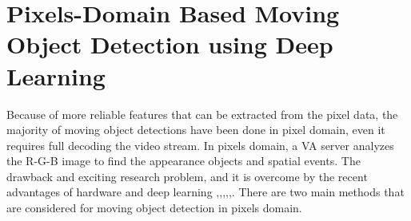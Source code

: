 \section{Pixels-Domain Based Moving Object Detection using Deep Learning}
Because of more reliable features that can be extracted from the pixel data, the majority of moving object detections have been done in pixel domain, even it requires full decoding the video stream. In pixels domain, a VA server analyzes the R-G-B image to find the appearance objects and spatial events. The drawback and exciting research problem, and it is overcome by the recent advantages of hardware and deep learning \cite{zeng2018background},\cite{chen2017pixel},\cite{babaee2018deep},\cite{wang2017interactive},\cite{patil2018msfgnet},\cite{ou2019moving}. There are two main methods that are considered for moving object detection in pixels domain.
